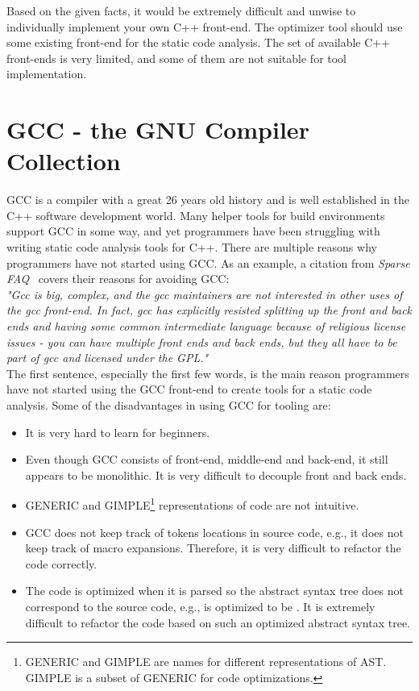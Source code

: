 Based on the given facts, it would be extremely difficult and unwise to individually implement your own C++ front-end. The optimizer tool should use some existing front-end for the static code analysis. The set of available C++ front-ends is very limited, and some of them are not suitable for tool implementation.

\section{GCC - the GNU Compiler Collection}
GCC is a compiler with a great 26 years old history and is well established in the C++ software development world. Many helper tools for build environments support GCC in some way, and yet programmers have been struggling with writing static code analysis tools for C++. There are multiple reasons why programmers have not started using GCC. As an example, a citation from \emph{Sparse FAQ}~\cite{sparse} covers their reasons for avoiding GCC: \\

\textit{"Gcc is big, complex, and the gcc maintainers are not interested in other uses of the gcc front-end.  In fact, gcc has explicitly resisted splitting up the front and back ends and having some common intermediate language because of religious license issues - you can have multiple front ends and back ends, but they all have to be part of gcc and licensed under the GPL."}\\

The first sentence, especially the first few words, is the main reason programmers have not started using the GCC front-end to create tools for a static code analysis. Some of the disadvantages in using GCC for tooling are:

\begin{itemize}
\item It is very hard to learn for beginners.

\item Even though GCC consists of front-end, middle-end and back-end, it still appears to be monolithic. It is very difficult to decouple front and back ends.

\item GENERIC and GIMPLE\footnote{GENERIC and GIMPLE are names for different representations of AST. GIMPLE is a subset of GENERIC for code optimizations.} representations of code are not intuitive.

\item GCC does not keep track of tokens locations in source code, e.g., it does not keep track of macro expansions. Therefore, it is very difficult to refactor the code correctly.

\item The code is optimized when it is parsed so the abstract syntax tree does not correspond to the source code, e.g.,  is optimized to be . It is extremely difficult to refactor the code based on such an optimized abstract syntax tree.
\end{itemize}

